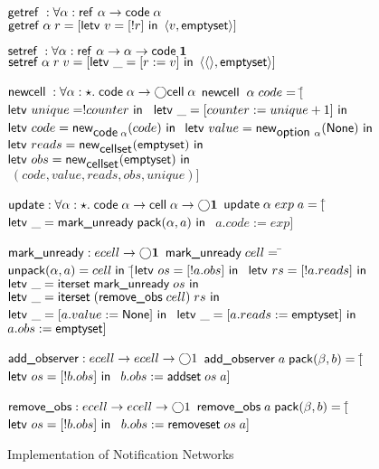 \documentclass[preprint,natbib]{sigplanconf}
\begin{document}
\begin{figure}
{\begin{specification}
$\getref : \forall \alpha : \reftype{\alpha} \to \codetype{\alpha}$ \nextline
$\getref \alpha\;r = \comp{\letv{v}{\comp{!r}}{\pair{v}{\ctext{emptyset}}}}$ 

$\setref : \forall \alpha : \reftype{\alpha} \to \alpha \to \codetype{\unittype}$ \nextline
$\setref \alpha\;r\;v = \comp{\letv{\_}{\comp{r := v}}{\pair{\unit}{\ctext{emptyset}}}}$ 

$\newcell : \forall \alpha:\star.\; \codetype{\alpha} \to \monad{\celltype{\alpha}}$ \nextline
$\newcell\;\alpha\;code = [$\=$\letv{unique}{!counter}{}$ \nextline
                       \>$\letv{\_}{\comp{counter := unique + 1}}{}$ \nextline
                                   \>$\letv{code}{\newref{\codetype{\alpha}}{code}}{}$ \nextline
                                   \>$\letv{value}{\newref{\opttype{\alpha}}{\ctext{None}}}{}$ \nextline
                                   \>$\letv{reads}{\newref{\cellset}{\ctext{emptyset}}}{}$ \nextline
                                   \>$\letv{obs}{\newref{\cellset}{\ctext{emptyset}}}{}$ \nextline
                                   \>$\; (code, value, reads, obs, unique)]$ 

$\updatecell : \forall \alpha:\star.\; \codetype{\alpha} \to \celltype{\alpha} \to \monad{\unittype}$\nextline
$\updatecell\;\alpha\;exp\;a = 
     [$\=$\letv{\_}{\ctext{mark\_unready}\;\pack{\alpha}{a}}{}$ \nextline
       \>$a.code := exp]$ 

$\ctext{mark\_unready} : ecell \to \monad{\unittype}$ \nextline
$\ctext{mark\_unready}\;cell =\; $\=$\ctext{unpack}(\alpha, a) = cell\; \ctext{in}$\nextline
\>  $[$\=$\letv{os}{\comp{!a.obs}}{}$ \nextline
\>     \>$\letv{rs}{\comp{!a.reads}}{}$ \nextline
\>     \>$\letv{\_}{\ctext{iterset}\;\ctext{mark\_unready}\;os}{}$ \nextline
\>     \>$\letv{\_}{\ctext{iterset}\;(\ctext{remove\_obs}\;cell)\;rs}{}$ \nextline
\>     \>$\letv{\_}{\comp{a.value := \ctext{None}}}{}$ \nextline
\>     \>$\letv{\_}{\comp{a.reads := \ctext{emptyset}}}{}$ \nextline
\>     \>$a.obs   := \ctext{emptyset}]$ \nextline[0.5em]

$\ctext{add\_observer} : ecell  \to ecell \to \monad{1}$\nextline
$\ctext{add\_observer}\;a\;\pack{\beta}{b} = [$\=
 $\letv{os}{\comp{!b.obs}}{}$ \nextline
\> $b.obs := \addset\;os\;a]$ \nextline[0.5em]

$\ctext{remove\_obs} : ecell \to ecell \to \monad{1}$\nextline
$\ctext{remove\_obs}\; a\;\pack{\beta}{b} = [$\=
  $\letv{os}{\comp{!b.obs}}{}$ \nextline
\>$b.obs := \ctext{removeset}\;os\;a]$ 
\end{specification}
}
\caption{Implementation of Notification Networks}
\label{notification-implementation}
\end{figure}
\end{document}
